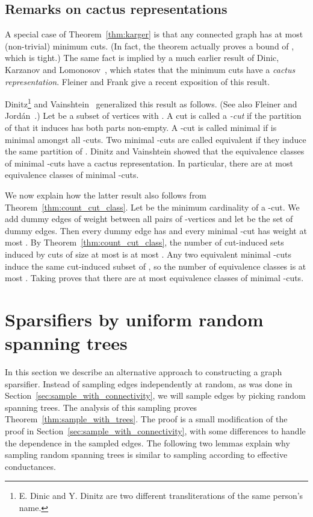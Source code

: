 \documentclass[11pt]{article}
\numberwithin{equation}{section}
\newcommand{\newterm}[1]{\textit{#1}}
\newcommand{\Section}[1]{Section~\ref{sec:#1}}
\newcommand{\Theorem}[1]{Theorem~\ref{thm:#1}}
\begin{document}
\subsection{Remarks on cactus representations}

A special case of \Theorem{karger} is that any connected graph  has at most
 (non-trivial) minimum cuts.
(In fact, the theorem actually proves a bound of , which is tight.)
The same fact is implied by a much earlier result of Dinic, Karzanov and Lomonosov~\cite{DKL},
which states that the minimum cuts have a \newterm{cactus representation}.
Fleiner and Frank \cite{FleinerFrank} give a recent exposition of this result.

Dinitz\footnote{E. Dinic and Y. Dinitz are two different transliterations of the same person's name.}
and Vainshtein~\cite{DVConf,DV} generalized this result as follows.
(See also Fleiner and Jord\'an~\cite{FleinerJordan}.)
Let  be a subset of vertices with .
A cut  is called a \newterm{-cut} if 
the partition  of  that it induces
has both parts non-empty.
A -cut  is called minimal if  is minimal amongst all -cuts.
Two minimal -cuts are called equivalent if they induce the same partition of .
Dinitz and Vainshtein showed that the equivalence classes of minimal -cuts have
a cactus representation.
In particular, there are at most  equivalence classes of minimal -cuts.

We now explain how the latter result also follows from \Theorem{count_cut_class}.
Let  be the minimum cardinality of a -cut.
We add dummy edges of weight  between all pairs of -vertices
and let  be the set of dummy edges.
Then every dummy edge  has  and every minimal -cut has weight at most
.
By \Theorem{count_cut_class}, the number of cut-induced sets induced by
cuts of size at most  is at most .
Any two equivalent minimal -cuts induce the same cut-induced subset of ,
so the number of equivalence classes is at most .
Taking  proves that there are at most
 equivalence classes of minimal -cuts.



\section{Sparsifiers by uniform random spanning trees}
\label{sec:spanning_tree}

In this section we describe an alternative approach to constructing a graph sparsifier.
Instead of sampling edges independently at random, as was done in
\Section{sample_with_connectivity},
we will sample edges by picking random spanning trees.
The analysis of this sampling proves \Theorem{sample_with_trees}.
The proof is a small modification of the proof in \Section{sample_with_connectivity},
with some differences to handle the dependence in the sampled edges.
The following two lemmas explain why sampling random spanning trees
is similar to sampling according to effective conductances.
\end{document}

